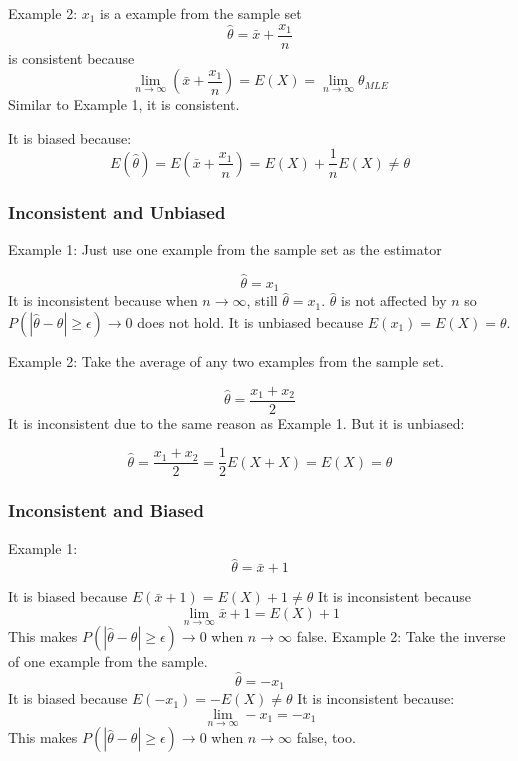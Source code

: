 \documentclass[twoside,11pt]{homework}
\begin{document}
\noindent Example 2:
\noindent $x_1$ is a example from the sample set
\begin{equation*}
\hat{\theta} = \bar{x} + \frac{x_1}{n}
\end{equation*}\noindent  is consistent because
\begin{equation*}
\lim_{n \to \infty} (\bar{x} + \frac{x_1}{n}) = E(X) = \lim_{n \to \infty} \theta_{MLE} 
\end{equation*}
\noindent Similar to Example 1, it is consistent.

\noindent It is biased because: 
\begin{equation*}
E(\hat{\theta}) = E(\bar{x} + \frac{x_1}{n}) = E(X) + \frac{1}{n}E(X) \neq \theta
\end{equation*}
\newpage

\subsubsection*{Inconsistent and Unbiased}
Example 1:
Just use one example from the sample set as the estimator

\begin{equation*}
\hat{\theta} = x_{1}
\end{equation*}
It is inconsistent because when $n \to \infty$, still $\hat{\theta} = x_{1}$. $\hat{\theta}$ is not affected by $n$ so $P(|\hat{\theta}- \theta| \geq \epsilon) \to 0$ does not hold. 
It is unbiased because $E(x_{1}) = E(X) = \theta$. 

Example 2:
Take the average of any two examples from the sample set. 

\begin{equation*}
\hat{\theta} = \frac{x_{1} + x_{2}}{2}
\end{equation*}
It is inconsistent due to the same reason as Example 1. 
But it is unbiased:

\begin{equation*}
\hat{\theta} = \frac{x_{1} + x_{2}}{2} = \frac{1}{2}E(X+X) = E(X) = \theta
\end{equation*}
\subsubsection*{Inconsistent and Biased}
Example 1:
\begin{equation*}
\hat{\theta} = \bar{x} + 1
\end{equation*}

It is biased because $E(\bar{x} + 1) = E(X) + 1 \neq \theta$
It is inconsistent because
\begin{equation*}
\lim_{n \to \infty} \bar{x} + 1 = E(X) + 1
\end{equation*}
This makes $P(|\hat{\theta}- \theta| \geq \epsilon) \to 0$ when $n \to \infty$ false. 
\noindent Example 2:
Take the inverse of one example from the sample. 
\begin{equation*}
\hat{\theta} =  -x_{1}
\end{equation*}It is biased because $E(-x_{1}) = -E(X)  \neq \theta$
It is inconsistent because:
\begin{equation*}
\lim_{n \to \infty}  -x_{1} = -x_{1} 
\end{equation*}This makes $P(|\hat{\theta}- \theta| \geq \epsilon) \to 0$ when $n \to \infty$ false, too. 
\newpage
\end{document}

